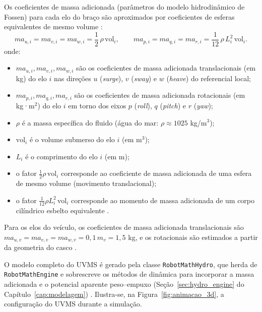 Os coeficientes de massa adicionada (parâmetros do modelo hidrodinâmico de Fossen) para cada elo do braço são aproximados por coeficientes de esferas equivalentes de mesmo volume \cite{newman1977marine, fossen2011handbook}:
\begin{equation}
    ma_{u,i} = ma_{v,i} = ma_{w,i} = \frac{1}{2}\,\rho\,\text{vol}_i, \qquad
    ma_{p,i} = ma_{q,i} = ma_{r,i} = \frac{1}{12}\,\rho\,L_i^2\,\text{vol}_i.
    \label{eq:ma_esferas}
\end{equation}
onde:
\begin{itemize}
    \item $ma_{u,i}, ma_{v,i}, ma_{w,i}$ são os coeficientes de massa adicionada translacionais (em kg) do elo $i$ nas direções $u$ (\textit{surge}), $v$ (\textit{sway}) e $w$ (\textit{heave}) do referencial local;
    \item $ma_{p,i}, ma_{q,i}, ma_{r,i}$ são os coeficientes de massa adicionada rotacionais (em kg·m$^2$) do elo $i$ em torno dos eixos $p$ (\textit{roll}), $q$ (\textit{pitch}) e $r$ (\textit{yaw});
    \item $\rho$ é a massa específica do fluido (água do mar: $\rho \approx 1025$ kg/m$^3$);
    \item $\text{vol}_i$ é o volume submerso do elo $i$ (em m$^3$);
    \item $L_i$ é o comprimento do elo $i$ (em m);
    \item o fator $\frac{1}{2}\rho\,\text{vol}_i$ corresponde ao coeficiente de massa adicionada de uma esfera de mesmo volume (movimento translacional);
    \item o fator $\frac{1}{12}\rho L_i^2\,\text{vol}_i$ corresponde ao momento de massa adicionada de um corpo cilíndrico esbelto equivalente \cite{newman1977marine, fossen2011handbook}.
\end{itemize}
Para os elos do veículo, os coeficientes de massa adicionada translacionais são $ma_{u,v} = ma_{v,v} = ma_{w,v} = 0{,}1\,m_v = 1{,}5$ kg, e os rotacionais são estimados a partir da geometria do casco \cite{antonelli2014modelling, aldhaheri2022underwater}.

O modelo completo do UVMS é gerado pela classe \texttt{RobotMathHydro}, que herda de \texttt{RobotMathEngine} e sobrescreve os métodos de dinâmica para incorporar a massa adicionada e o potencial aparente peso--empuxo (Seção~\ref{sec:hydro_engine} do Capítulo~\ref{cap:modelagem}) \cite{fossen2011handbook, antonelli2014modelling}. Ilustra-se, na Figura~\ref{fig:animacao_3d}, a configuração do UVMS durante a simulação.

